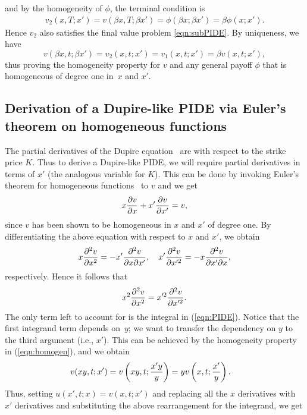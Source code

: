 and by the homogeneity of $\phi$, the terminal condition is
	\begin{align*}
		v_2(x,T;x') = v\left( \beta x, T; \beta x' \right) = \phi(\beta x; \beta x') = \beta \phi(x;x').
	\end{align*}
Hence $v_2$ also satisfies the final value problem \eqref{eqn:subPIDE}. By uniqueness, we have
	\begin{equation*}
		v\left(\beta x, t; \beta x'\right) = v_2(x,t;x') = v_1(x,t;x') = \beta v(x,t;x'),
	\end{equation*}
thus proving the homogeneity property for $v$ and any general payoff $\phi$ that is homogeneous of degree one in~$x$ and $x'$.

\subsection{Derivation of a Dupire-like PIDE via Euler's theorem on homogeneous functions}
The partial derivatives of the Dupire equation~\cite{Gatheral2006} are with respect to the strike price $K$. Thus to derive a Dupire-like PIDE, we will require partial derivatives in terms of $x'$ (the analogous variable for $K$). This can be done by invoking Euler's theorem for homogeneous functions~\cite[pp. 317]{Kishan2007} to $v$ and we get
	\begin{equation*}
		x\frac{\partial v}{\partial x} + x'\frac{\partial v}{\partial x'} = v,
	\end{equation*}
since $v$ has been shown to be homogeneous in $x$ and $x'$ of degree one. By differentiating the above equation with respect to $x$ and $x'$, we obtain
	\begin{equation*}
		x\frac{\partial^2 v}{\partial x^2} = -x'\frac{\partial^2 v}{\partial x \partial x'}, \quad x'\frac{\partial^2 v}{\partial x'^2} = -x\frac{\partial^2 v}{\partial x' \partial x},
	\end{equation*}
respectively. Hence it follows that
	\begin{equation*}
		x^2\frac{\partial^2 v}{\partial x^2} = x'^2\frac{\partial^2 v}{\partial x'^2}.
	\end{equation*}
The only term left to account for is the integral in (\ref{eqn:PIDE}). Notice that the first integrand term depends on~$y$; we want to transfer the dependency on $y$ to the third argument (i.e., $x'$). This can be achieved by the homogeneity property in (\ref{eqn:homogen}), and we obtain
	\begin{align*}
		v(xy,t; x') &= v\left(xy,t;\frac{x'y}{y}\right) = yv\left( x,t;\frac{x'}{y} \right).
	\end{align*}
Thus, setting $u(x',t; x) = v(x,t; x')$ and replacing all the $x$ derivatives with $x'$ derivatives and substituting the above rearrangement for the integrand, we get
